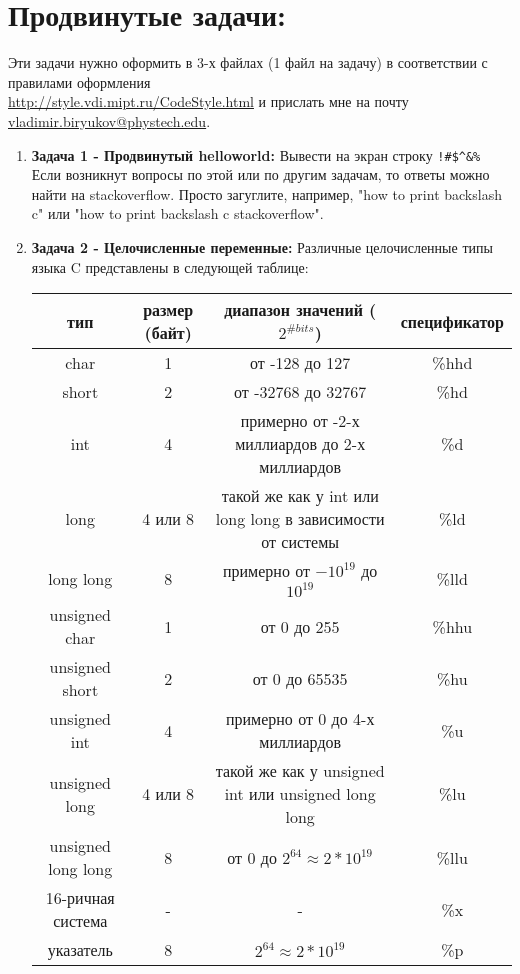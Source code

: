 \documentclass{article}
\begin{document}
\section*{Продвинутые задачи:}
Эти задачи нужно оформить в 3-х файлах (1 файл на задачу) в соответствии с правилами оформления\\ \href{http://style.vdi.mipt.ru/CodeStyle.html}{http://style.vdi.mipt.ru/CodeStyle.html} и прислать мне на почту \href{mailto:vladimir.biryukov@phystech.edu}{vladimir.biryukov@phystech.edu}.
\begin{enumerate}
\item \textbf{Задача 1 - Продвинутый helloworld:} 
Вывести на экран строку \texttt{!\textbackslash@\#\$\textasciicircum\&\%} Если возникнут вопросы по этой или по другим задачам, то ответы можно найти на stackoverflow. Просто загуглите, например, "how to print backslash c" или "how to print backslash c stackoverflow".


\item \textbf{Задача 2 - Целочисленные переменные:} Различные целочисленные типы языка C представлены в следующей таблице:

\begin{center}
\begin{tabular}{ c c c c }
 тип & размер (байт) & диапазон значений ($2^{\# bits}$) & спецификатор \\ \hline
 char & 1 & от -128 до 127 & \%hhd \\ 
 short & 2 & от -32768 до 32767 & \%hd  \\  
 int & 4 & примерно от -2-х миллиардов до 2-х миллиардов & \%d  \\  
 long & 4 или 8 & такой же как у int или long long в зависимости от системы & \%ld  \\  
 long long & 8 & примерно от $-10^{19}$ до $10^{19}$ & \%lld  \\  
 unsigned char & 1 & от 0 до 255 & \%hhu \\ 
 unsigned short & 2 & от 0 до 65535 & \%hu  \\  
 unsigned int & 4 & примерно от 0 до 4-х миллиардов & \%u  \\  
 unsigned long & 4 или 8 & такой же как у unsigned int или unsigned long long & \%lu  \\  
 unsigned long long & 8 & от 0 до $2^{64} \approx 2*10^{19}$  & \%llu  \\  
 16-ричная система & - & - & \%x  \\ 
 указатель & 8 & $2^{64} \approx 2*10^{19}$ & \%p  \\  
\end{tabular}
\end{center}



\end{enumerate}
\end{document}
